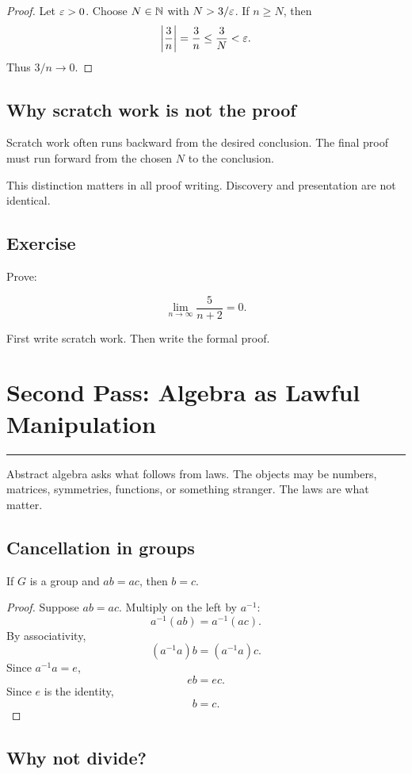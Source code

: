 \documentclass[12pt]{article}
\newcommand{\chapterline}{\vspace{0.4em}\hrule\vspace{0.8em}}
\begin{document}
\begin{proof}
Let $\varepsilon>0$. Choose $N\in\mathbb{N}$ with $N>3/\varepsilon$. If $n\geq N$, then
\[
\left|\frac3n\right|=\frac3n\leq\frac3N<\varepsilon.
\]
Thus $3/n\to0$.
\end{proof}

\subsection{Why scratch work is not the proof}

Scratch work often runs backward from the desired conclusion. The final proof must run forward from the chosen $N$ to the conclusion.

This distinction matters in all proof writing. Discovery and presentation are not identical.

\subsection{Exercise}

Prove:

\[
\lim_{n\to\infty}\frac{5}{n+2}=0.
\]

First write scratch work. Then write the formal proof.

\newpage
\section{Second Pass: Algebra as Lawful Manipulation}
\chapterline

Abstract algebra asks what follows from laws. The objects may be numbers, matrices, symmetries, functions, or something stranger. The laws are what matter.

\subsection{Cancellation in groups}

\begin{theorem}
If $G$ is a group and $ab=ac$, then $b=c$.
\end{theorem}

\begin{proof}
Suppose $ab=ac$. Multiply on the left by $a^{-1}$:
\[
a^{-1}(ab)=a^{-1}(ac).
\]
By associativity,
\[
(a^{-1}a)b=(a^{-1}a)c.
\]
Since $a^{-1}a=e$,
\[
eb=ec.
\]
Since $e$ is the identity,
\[
b=c.
\]
\end{proof}

\subsection{Why not divide?}
\end{document}
